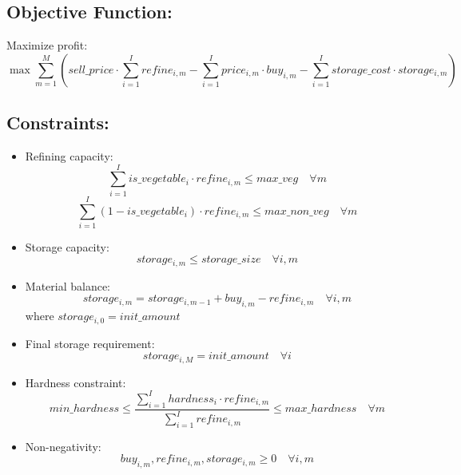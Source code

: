 \documentclass{article}
\begin{document}
\subsection*{Objective Function:}
Maximize profit:
\[
\max \sum_{m=1}^{M} \left( sell\_price \cdot \sum_{i=1}^{I} refine_{i,m} - \sum_{i=1}^{I} price_{i,m} \cdot buy_{i,m} - \sum_{i=1}^{I} storage\_cost \cdot storage_{i,m} \right)
\]

\subsection*{Constraints:}
\begin{itemize}
    \item Refining capacity:
    \[
    \sum_{i=1}^{I} is\_vegetable_{i} \cdot refine_{i,m} \leq max\_veg \quad \forall m
    \]
    \[
    \sum_{i=1}^{I} (1 - is\_vegetable_{i}) \cdot refine_{i,m} \leq max\_non\_veg \quad \forall m
    \]

    \item Storage capacity:
    \[
    storage_{i,m} \leq storage\_size \quad \forall i, m
    \]

    \item Material balance:
    \[
    storage_{i,m} = storage_{i,m-1} + buy_{i,m} - refine_{i,m} \quad \forall i, m
    \]
    where $storage_{i,0} = init\_amount$

    \item Final storage requirement:
    \[
    storage_{i,M} = init\_amount \quad \forall i
    \]

    \item Hardness constraint:
    \[
    min\_hardness \leq \frac{\sum_{i=1}^{I} hardness_{i} \cdot refine_{i,m}}{\sum_{i=1}^{I} refine_{i,m}} \leq max\_hardness \quad \forall m
    \]

    \item Non-negativity:
    \[
    buy_{i,m}, refine_{i,m}, storage_{i,m} \geq 0 \quad \forall i, m
    \]
\end{itemize}
\end{document}
